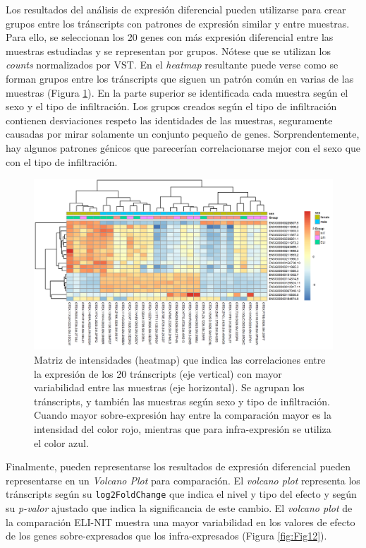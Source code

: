 \documentclass[
]{article}
\begin{document}
Los resultados del análisis de expresión diferencial pueden utilizarse
para crear grupos entre los tránscripts con patrones de expresión
similar y entre muestras. Para ello, se seleccionan los 20 genes con más
expresión diferencial entre las muestras estudiadas y se representan por
grupos. Nótese que se utilizan los \emph{counts} normalizados por VST.
En el \emph{heatmap} resultante puede verse como se forman grupos entre
los tránscripts que siguen un patrón común en varias de las muestras
(Figura \ref{fig:Fig11}). En la parte superior se identificada cada
muestra según el sexo y el tipo de infiltración. Los grupos creados
según el tipo de infiltración contienen desviaciones respeto las
identidades de las muestras, seguramente causadas por mirar solamente un
conjunto pequeño de genes. Sorprendentemente, hay algunos patrones
génicos que parecerían correlacionarse mejor con el sexo que con el tipo
de infiltración.

\begin{figure}

{\centering \includegraphics[width=0.8\linewidth]{results/4.DEAnl/5.Heatmap_2} 

}

\caption{Matriz de intensidades (heatmap) que indica las correlaciones entre la expresión de los 20 tránscripts (eje vertical) con mayor variabilidad entre las muestras (eje horizontal). Se agrupan los tránscripts, y también las muestras según sexo y tipo de infiltración. Cuando mayor sobre-expresión hay entre la comparación mayor es la intensidad del color rojo, mientras que para infra-expresión se utiliza el color azul.}\label{fig:Fig11}
\end{figure}

Finalmente, pueden representarse los resultados de expresión diferencial
pueden representarse en un \emph{Volcano Plot} para comparación. El
\emph{volcano plot} representa los tránscripts según su
\texttt{log2FoldChange} que indica el nivel y tipo del efecto y según su
\emph{p-valor} ajustado que indica la significancia de este cambio. El
\emph{volcano plot} de la comparación ELI-NIT muestra una mayor
variabilidad en los valores de efecto de los genes sobre-expresados que
los infra-expresados (Figura \ref{fig:Fig12}).
\end{document}
